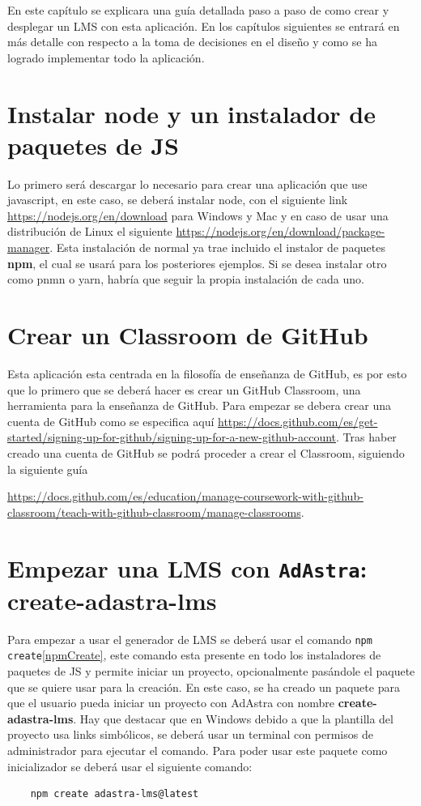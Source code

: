 En este capítulo se explicara una guía detallada paso a paso de como crear y desplegar un LMS con esta aplicación. En los capítulos siguientes se entrará en más detalle con respecto a la toma de decisiones en el diseño y como se ha logrado implementar todo la aplicación.

\section{Instalar node y un instalador de paquetes de JS}

Lo primero será descargar lo necesario para crear una aplicación que use javascript, en este caso, se deberá instalar node, con el siguiente link \url{https://nodejs.org/en/download} para Windows y Mac y en caso de usar una distribución de Linux el siguiente \url{https://nodejs.org/en/download/package-manager}. Esta instalación de normal ya trae incluido el instalor de paquetes \textbf{npm}, el cual se usará para los posteriores ejemplos. Si se desea instalar otro como pnmn\cite{pnpm} o yarn\cite{yarn}, habría que seguir la propia instalación de cada uno.

\section{Crear un Classroom de GitHub}

Esta aplicación esta centrada en la filosofía de enseñanza de GitHub, es por esto que lo primero que se deberá hacer es crear un GitHub Classroom, una herramienta para la enseñanza de GitHub. Para empezar se debera crear una cuenta de GitHub como se especifica aquí \url{https://docs.github.com/es/get-started/signing-up-for-github/signing-up-for-a-new-github-account}. Tras haber creado una cuenta de GitHub se podrá proceder a crear el Classroom, siguiendo la siguiente guía 

\url{https://docs.github.com/es/education/manage-coursework-with-github-classroom/teach-with-github-classroom/manage-classrooms}.

\section{Empezar una LMS con {\tt AdAstra}: create-adastra-lms}

Para empezar a usar el generador de LMS se deberá usar el comando \verb|npm create|\ref{npmCreate}, este comando esta presente en todo los instaladores de paquetes de JS y permite iniciar un proyecto, opcionalmente pasándole el paquete que se quiere usar para la creación. En este caso, se ha creado un paquete para que el usuario pueda iniciar un proyecto con AdAstra con nombre \textbf{create-adastra-lms}. Hay que destacar que en Windows debido a que la plantilla del proyecto usa links simbólicos, se deberá usar un terminal con permisos de administrador para ejecutar el comando. Para poder usar este paquete como inicializador se deberá usar el siguiente comando:
\begin{verbatim}
    npm create adastra-lms@latest
\end{verbatim}

